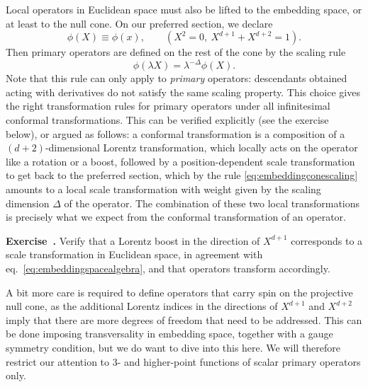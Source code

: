 \documentclass[a4paper,12pt]{article}
\numberwithin{equation}{section}
\newcounter{exercise}[section]
\newenvironment{exercise}[1][]%
	{\refstepcounter{exercise}\bigskip
	\begin{mdframed}[backgroundcolor=gray!20, linewidth=0]
	\noindent\textbf{Exercise~\thesection.\theexercise #1} \rmfamily}
  	{\end{mdframed}\bigskip}
\begin{document}
Local operators in Euclidean space must also be lifted to the embedding space, or at least to the null cone. On our preferred section, we declare
\begin{equation}
	\phi(X) \equiv \phi(x),
	\qquad 
	\left( X^2 = 0, ~ X^{d+1} + X^{d+2} = 1 \right).
\end{equation}
Then primary operators are defined on the rest of the cone by the scaling rule
\begin{equation}
	\phi(\lambda X) = \lambda^{-\Delta} \phi(X).
	\label{eq:embeddingconescaling}
\end{equation}
Note that this rule can only apply to \emph{primary} operators: descendants obtained acting with derivatives do not satisfy the same scaling property.
This choice gives the right transformation rules for primary operators under all infinitesimal conformal transformations. This can be verified explicitly (see the exercise below), or argued as follows: a conformal transformation is a composition of a $(d+2)$-dimensional Lorentz transformation, which locally acts on the operator like a rotation or a boost, followed by a position-dependent scale transformation to get back to the preferred section, which by the rule \eqref{eq:embeddingconescaling} amounts to a local scale transformation with weight given by the scaling dimension $\Delta$ of the operator. The combination of these two local transformations is precisely what we expect from the conformal transformation of an operator.
%
\begin{exercise}
	Verify that a Lorentz boost in the direction of $X^{d+1}$
	corresponds to a scale transformation in Euclidean space,
	in agreement with eq.~\eqref{eq:embeddingspacealgebra},
	and that operators transform accordingly. 
\end{exercise}

A bit more care is required to define operators that carry spin on the projective null cone, as the additional Lorentz indices in the directions of $X^{d+1}$ and $X^{d+2}$ imply that there are more degrees of freedom that need to be addressed. This can be done imposing transversality in embedding space, together with a gauge symmetry condition, but we do want to dive into this here. We will therefore restrict our attention to 3- and higher-point functions of scalar primary operators only.
\end{document}
